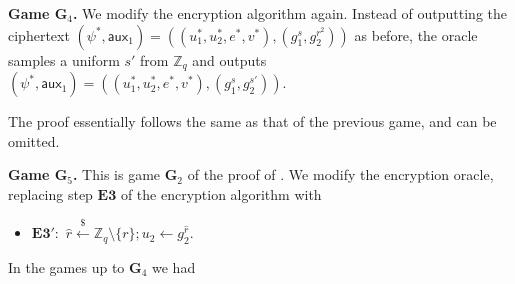 \documentclass[10pt,a4paper]{article}
\newcommand{\rgets}{\xleftarrow{\$}}
\newcommand{\aux}{\mathsf{aux}}
\newcommand{\game}{\mathbf{G}}
\newcommand{\estep}[1]{\mathbf{E#1}}
\newcommand{\Z}{\mathbb{Z}}
\begin{document}
	\textbf{Game $\game_4$.} We modify the encryption algorithm again. Instead of outputting the ciphertext $(\psi^{*}, \aux_1) = ((u_1^{*}, u_2^{*}, e^{*}, v^{*}), (g_1^{s}, g_2^{r^2}))$ as before, the oracle samples a uniform $s'$ from $\mathbb{Z}_{q}$ and outputs $(\psi^{*}, \aux_1) = ((u_1^{*}, u_2^{*}, e^{*}, v^{*}), (g_1^{s}, g_2^{s'}))$. 
	
	The proof essentially follows the same as that of the previous game, and can be omitted.
	
	\textbf{Game $\game_5$.} This is game $\game_2$ of the proof of \cite{cs01}. We modify the encryption oracle, replacing step $\estep{3}$ of the encryption algorithm with
	\begin{itemize}
		\item[] $\estep{3}':$ $\hat{r}\rgets\Z_q\setminus\{r\}; u_2\gets g_2^{\hat{r}}$.
	\end{itemize}
	In the games up to $\game_4$ we had 
\end{document}
